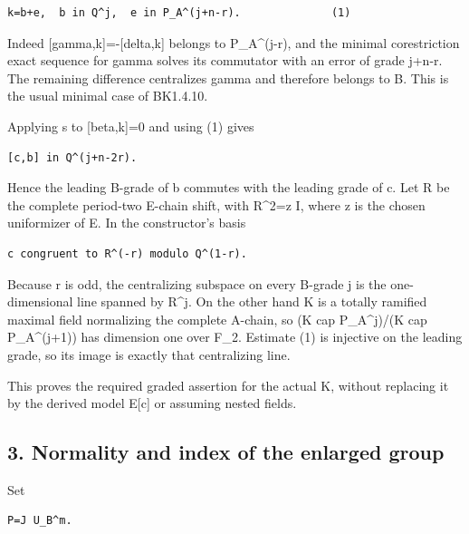 \begin{Verbatim}[fontsize=\small,breaklines=true,breakanywhere=true]
k=b+e,  b in Q^j,  e in P_A^(j+n-r).              (1)
\end{Verbatim}

Indeed {[}gamma,k{]}=-{[}delta,k{]} belongs to P\_A\^{}(j-r), and the
minimal corestriction exact sequence for gamma solves its commutator
with an error of grade j+n-r. The remaining difference centralizes gamma
and therefore belongs to B. This is the usual minimal case of BK1.4.10.

Applying s to {[}beta,k{]}=0 and using (1) gives

\begin{Verbatim}[fontsize=\small,breaklines=true,breakanywhere=true]
[c,b] in Q^(j+n-2r).
\end{Verbatim}

Hence the leading B-grade of b commutes with the leading grade of c. Let
R be the complete period-two E-chain shift, with R\^{}2=z I, where z is
the chosen uniformizer of E. In the constructor's basis

\begin{Verbatim}[fontsize=\small,breaklines=true,breakanywhere=true]
c congruent to R^(-r) modulo Q^(1-r).
\end{Verbatim}

Because r is odd, the centralizing subspace on every B-grade j is the
one-dimensional line spanned by R\^{}j. On the other hand K is a totally
ramified maximal field normalizing the complete A-chain, so (K cap
P\_A\^{}j)/(K cap P\_A\^{}(j+1)) has dimension one over F\_2. Estimate
(1) is injective on the leading grade, so its image is exactly that
centralizing line.

This proves the required graded assertion for the actual K, without
replacing it by the derived model E{[}c{]} or assuming nested fields.

\hypertarget{rank4-normality-and-index-of-the-enlarged-group}{%
\subsection{3. Normality and index of the enlarged
group}\label{rank4-normality-and-index-of-the-enlarged-group}}

Set

\begin{Verbatim}[fontsize=\small,breaklines=true,breakanywhere=true]
P=J U_B^m.
\end{Verbatim}

